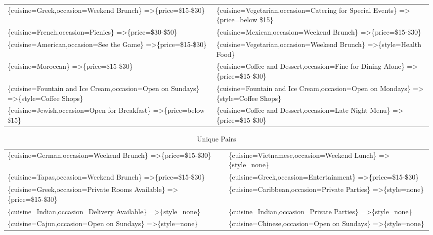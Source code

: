 \documentclass[letterpaper,10pt]{article}
\begin{document}
\begin{appendices}
\begin{table}[h]
\begin{adjustbox}{max width=\textwidth}
\begin{tabular}{ll}
\{cuisine=Greek,occasion=Weekend Brunch\} =\textgreater \{price=\$15-\$30\} & \{cuisine=Vegetarian,occasion=Catering for Special Events\} =\textgreater \{price=below \$15\} \\ 
\{cuisine=French,occasion=Picnics\} =\textgreater \{price=\$30-\$50\} & \{cuisine=Mexican,occasion=Weekend Brunch\} =\textgreater \{price=\$15-\$30\} \\ 
\{cuisine=American,occasion=See the Game\} =\textgreater \{price=\$15-\$30\} & \{cuisine=Vegetarian,occasion=Weekend Brunch\} =\textgreater \{style=Health Food\} \\ 
\{cuisine=Moroccan\} =\textgreater \{price=\$15-\$30\} & \{cuisine=Coffee and Dessert,occasion=Fine for Dining Alone\} =\textgreater \{price=\$15-\$30\} \\ 
\{cuisine=Fountain and Ice Cream,occasion=Open on Sundays\} =\textgreater \{style=Coffee Shops\} & \{cuisine=Fountain and Ice Cream,occasion=Open on Mondays\} =\textgreater \{style=Coffee Shops\} \\ 
\{cuisine=Jewish,occasion=Open for Breakfast\} =\textgreater \{price=below \$15\} & \{cuisine=Coffee and Dessert,occasion=Late Night Menu\} =\textgreater \{price=\$15-\$30\} \\ 
\end{tabular}
\end{adjustbox}
\end{table}
\begin{table}[h]
\caption*{Unique Pairs}
\begin{adjustbox}{max width=\textwidth}
\begin{tabular}{ll}
\{cuisine=German,occasion=Weekend Brunch\} =\textgreater \{price=\$15-\$30\} & \{cuisine=Vietnamese,occasion=Weekend Lunch\} =\textgreater \{style=none\} \\ 
\{cuisine=Tapas,occasion=Weekend Brunch\} =\textgreater \{price=\$15-\$30\} & \{cuisine=Greek,occasion=Entertainment\} =\textgreater \{price=\$15-\$30\} \\ 
\{cuisine=Greek,occasion=Private Rooms Available\} =\textgreater \{price=\$15-\$30\} & \{cuisine=Caribbean,occasion=Private Parties\} =\textgreater \{style=none\} \\ 
\{cuisine=Indian,occasion=Delivery Available\} =\textgreater \{style=none\} & \{cuisine=Indian,occasion=Private Parties\} =\textgreater \{style=none\} \\ 
\{cuisine=Cajun,occasion=Open on Sundays\} =\textgreater \{style=none\} & \{cuisine=Chinese,occasion=Open on Sundays\} =\textgreater \{style=none\} \\ 

\end{tabular}
\end{adjustbox}
\end{table}
\end{appendices}
\end{document}
